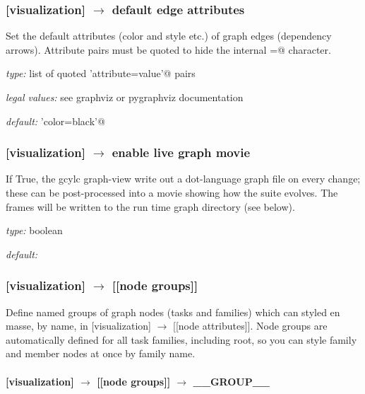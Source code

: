 \subsubsection[default edge attributes]{[visualization] $\rightarrow$ default edge attributes}

Set the default attributes (color and style etc.) of graph edges
(dependency arrows).  Attribute pairs must be quoted to hide the
internal \lstinline@=@ character.
\begin{myitemize}
    \item {\em type:} list of quoted \lstinline@'attribute=value'@ pairs
    \item {\em legal values:} see graphviz or pygraphviz documentation
    \item {\em default:} \lstinline@'color=black'@
\end{myitemize}

\subsubsection[enable live graph movie]{[visualization] $\rightarrow$ enable live graph movie}

If True, the gcylc graph-view write out a dot-language graph file on
every change; these can be post-processed into a movie
showing how the suite evolves. The frames will be written to the run
time graph directory (see below).

\begin{myitemize}
    \item {\em type:} boolean
    \item {\em default:} \lstinline@False@
\end{myitemize}

\subsubsection[{[[}node groups{]]}]{[visualization] $\rightarrow$ [[node groups]]}

Define named groups of graph nodes (tasks and families) which can styled
en masse, by name, in [visualization] $\rightarrow$ [[node attributes]].
Node groups are automatically defined for all task families, including
root, so you can style family and member nodes at once by family name.

\paragraph[\_\_GROUP\_\_]{[visualization] $\rightarrow$ [[node groups]] $\rightarrow$ \_\_GROUP\_\_}

